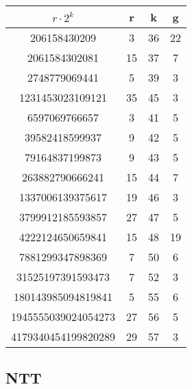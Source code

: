 \clearpage
\begin{table}[htbp]
  \vspace{1cm}
  \centering
  \begin{tabular}{ c | c | c | c }
    \hline
    {\bf $r \cdot 2^k$} & {\bf r} & {\bf k} & {\bf g}\\
    \hline
    206158430209	&	3	&36	&22 \\
    \hline
    2061584302081	&	15	&37	&7 \\
    \hline
    2748779069441	&	5	&39	&3 \\
    \hline
    1231453023109121	&35	&45	&	3 \\
    \hline
    6597069766657	&	3	&41	&5 \\
    \hline
    39582418599937	&	9	&42	&5 \\
    \hline
    79164837199873	&	9	&43	&5 \\
    \hline
    263882790666241	&	15	&44	&7 \\
    \hline
    1337006139375617	&19	&46	&	3 \\
    \hline
    3799912185593857	&27	&47	&	5 \\
    \hline
    4222124650659841	&15	&48	&	19 \\
    \hline
    7881299347898369	&7	&	50	&	6 \\
    \hline
    31525197391593473	&7	&	52	&	3 \\
    \hline
    180143985094819841	&5	&	55	&	6 \\
    \hline
    1945555039024054273	&27	&	56	&	5 \\
    \hline
    4179340454199820289	&29	&	57	&	3 \\
    \hline

  \end{tabular}
\end{table}

\subsection{NTT}

